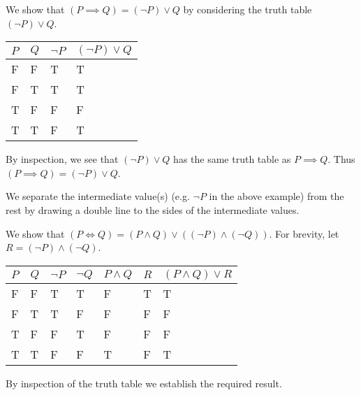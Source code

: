 \begin{example}
    We show that $(P \implies Q) = (\lnot P) \lor Q$ by considering the truth table $(\lnot P) \lor Q$.
    \begin{table}[h]
        \centering
        \begin{tabular}{|l|l||l||l|}
            \hline
            $P$ & $Q$ & $\lnot P$ & $(\lnot P) \lor Q$ \\ \hline
            F   & F   & T         & T                  \\ \hline
            F   & T   & T         & T                  \\ \hline
            T   & F   & F         & F                  \\ \hline
            T   & T   & F         & T                  \\ \hline
        \end{tabular}
    \end{table}
    
    By inspection, we see that $(\lnot P) \lor Q$ has the same truth table as $P \implies Q$. Thus $(P \implies Q) = (\lnot P) \lor Q$.
\end{example}
\begin{remark}
    We separate the intermediate value(s) (e.g. $\lnot P$ in the above example) from the rest by drawing a double line to the sides of the intermediate values.
\end{remark}

\begin{example}
    We show that $(P \iff Q) = (P \land Q) \lor ((\lnot P) \land (\lnot Q))$. For brevity, let $R = (\lnot P) \land (\lnot Q)$.
    \begin{table}[h]
        \centering
        \begin{tabular}{|l|l||l|l|l|l||l|}
            \hline
            $P$ & $Q$ & $\lnot P$ & $\lnot Q$ & $P \land Q$ & $R$ & $(P \land Q) \lor R$ \\ \hline
            F   & F   & T         & T         & F           & T   & T                    \\ \hline
            F   & T   & T         & F         & F           & F   & F                    \\ \hline
            T   & F   & F         & T         & F           & F   & F                    \\ \hline
            T   & T   & F         & F         & T           & F   & T                    \\ \hline
        \end{tabular}
    \end{table}

    By inspection of the truth table we establish the required result.
\end{example}

